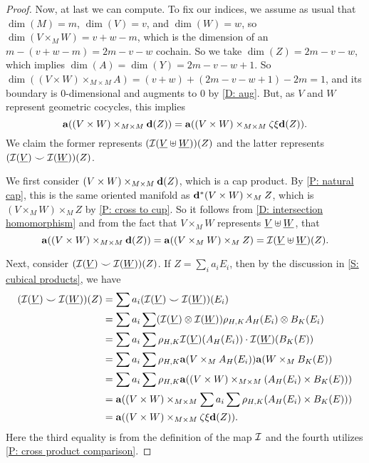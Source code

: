 \documentclass{amsart}
\begin{document}
\begin{proof}
Now, at last we can compute. To fix our indices, we assume as usual that $\dim(M)=m$, $\dim(V)=v$, and $\dim(W)=w$, so $\dim(V\times_MW)= v+w-m$, which is the dimension of an $m-(v+w-m)=2m-v-w$ cochain. So we take $\dim(Z)=2m-v-w$, which implies $\dim(A)=\dim(Y)=2m-v-w+1$. So $\dim((V\times W)\times_{M\times M}A)=(v+w)+(2m-v-w+1)-2m=1$, and its boundary is $0$-dimensional and augments to $0$ by \cref{D: aug}. But, as $V$ and $W$ represent geometric cocycles, 
this implies  $$\mathbf{a}((V\times W)\times_{M\times M}\mathbf{d}(Z))=\mathbf{a}((V\times W)\times_{M\times M}\zeta\xi\mathbf{d}(Z)).$$
We claim the former represents $(\mathcal{I}(\underline{V}\uplus\underline{W}))(Z)$ and the latter represents $(\mathcal{I}(\underline{V}) \smile \mathcal{I}(\underline{W}))(Z)$.

We first consider  $(V\times W)\times_{M\times M}\mathbf{d}(Z)$, which is a cap product. By \cref{P: natural cap}, this is the same oriented manifold as $\mathbf{d}^*(V\times W)\times_M Z$, which is $(V\times_MW)\times_M Z$ by \cref{P: cross to cup}. 
So it follows from \cref{D: intersection homomorphism} and from the fact that $V\times_MW$ represents $\underline{V}\uplus \underline{W}$, that $$\mathbf{a}((V\times W)\times_{M\times M}\mathbf{d}(Z))=\mathbf{a}((V\times_MW)\times_M Z)=\mathcal{I}(\underline{V}\uplus \underline{W})(Z).$$

Next, consider $(\mathcal{I}(\underline{V}) \smile \mathcal{I}(\underline{W}))(Z)$. If $Z=\sum_i a_iE_i$, then by the discussion in \cref{S: cubical products}, we have  
\begin{align*}
(\mathcal{I}(\underline{V}) \smile \mathcal{I}(\underline{W}))(Z)
&=\sum a_i (\mathcal{I}(\underline{V}) \smile \mathcal{I}(\underline{W}))(E_i)\\
&=\sum a_i\sum (\mathcal{I}(\underline{V}) \otimes \mathcal{I}(\underline{W}))  \rho_{H,K}A_H(E_i) \otimes B_K(E_i)\\
&=\sum a_i\sum \rho_{H,K}\mathcal{I}(\underline{V})(A_H(E_i))\cdot \mathcal{I}(\underline{W})(B_K(E))\\
&=\sum a_i\sum \rho_{H,K}\mathbf{a}(V\times_M A_H(E_i))\mathbf{a}(W\times_M B_K(E))\\
&=\sum a_i\sum \rho_{H,K}\mathbf{a}((V\times W)\times_{M\times M}( A_H(E_i)\times B_K(E)))\\
&=\mathbf{a}((V\times W)\times_{M\times M}\sum a_i\sum \rho_{H,K}( A_H(E_i)\times B_K(E)))\\
&=\mathbf{a}((V\times W)\times_{M\times M}\zeta\xi\mathbf{d}(Z)).\\
\end{align*}
Here the third equality is from the definition of the map $\mathcal{I}$ and the fourth utilizes \cref{P: cross product comparison}.
\end{proof}
\end{document}
